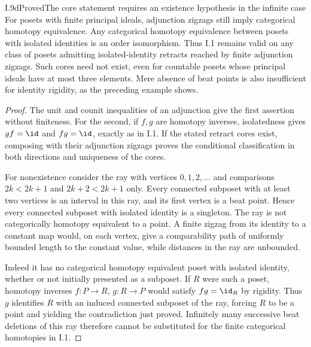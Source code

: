 \begin{claim}{I.9d}{Proved}{The core statement requires an existence hypothesis in the infinite case}
For posets with finite principal ideals, adjunction zigzags still
imply categorical homotopy equivalence. Any categorical homotopy
equivalence between posets with isolated identities is an order
isomorphism. Thus I.1 remains valid on any class of posets admitting
isolated-identity retracts reached by finite adjunction zigzags.
Such cores need not exist, even for countable posets whose principal
ideals have at most three elements. Mere absence of beat points is
also insufficient for identity rigidity, as the preceding example
shows.
\end{claim}
\begin{proof}
The unit and counit inequalities of an adjunction give the first
assertion without finiteness. For the second, if $f,g$ are homotopy
inverses, isolatedness gives $gf=\id$ and $fg=\id$, exactly as in
I.1. If the stated retract cores exist, composing with their
adjunction zigzags proves the conditional classification in both
directions and uniqueness of the cores.

For nonexistence consider the ray with vertices $0,1,2,\ldots$
and comparisons $2k<2k+1$ and $2k+2<2k+1$ only. Every connected
subposet with at least two vertices is an interval in this ray, and
its first vertex is a beat point. Hence every connected subposet
with isolated identity is a singleton. The ray is not categorically
homotopy equivalent to a point. A finite zigzag from its identity
to a constant map would, on each vertex, give a comparability path
of uniformly bounded length to the constant value, while distances
in the ray are unbounded.

Indeed it has no categorical homotopy equivalent poset with isolated
identity, whether or not initially presented as a subposet. If $R$
were such a poset, homotopy inverses $f:P\to R$, $g:R\to P$
would satisfy $fg=\id_R$ by rigidity. Thus $g$ identifies $R$
with an induced connected subposet of the ray, forcing $R$ to be
a point and yielding the contradiction just proved. Infinitely many
successive beat deletions of this ray therefore cannot be substituted
for the finite categorical homotopies in I.1.
\end{proof}
